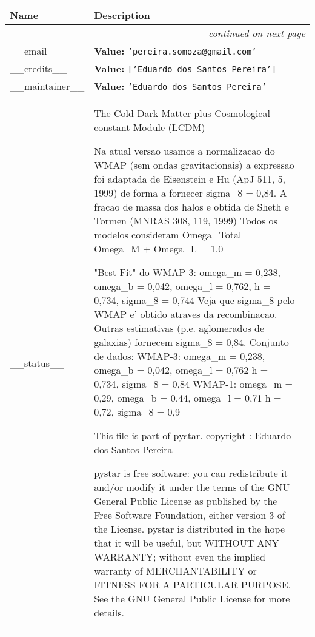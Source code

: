     \vspace{-1cm}
\hspace{\varindent}\begin{longtable}{|p{\varnamewidth}|p{\vardescrwidth}|l}
\cline{1-2}
\cline{1-2} \centering \textbf{Name} & \centering \textbf{Description}& \\
\cline{1-2}
\endhead\cline{1-2}\multicolumn{3}{r}{\small\textit{continued on next page}}\\\endfoot\cline{1-2}
\endlastfoot\raggedright \_\-\_\-e\-m\-a\-i\-l\-\_\-\_\- & \raggedright \textbf{Value:} 
{\tt \texttt{'}\texttt{pereira.somoza@gmail.com}\texttt{'}}&\\
\cline{1-2}
\raggedright \_\-\_\-c\-r\-e\-d\-i\-t\-s\-\_\-\_\- & \raggedright \textbf{Value:} 
{\tt \texttt{[}\texttt{'}\texttt{Eduardo dos Santos Pereira}\texttt{'}\texttt{]}}&\\
\cline{1-2}
\raggedright \_\-\_\-m\-a\-i\-n\-t\-a\-i\-n\-e\-r\-\_\-\_\- & \raggedright \textbf{Value:} 
{\tt \texttt{'}\texttt{Eduardo dos Santos Pereira}\texttt{'}}&\\
\cline{1-2}
\raggedright \_\-\_\-s\-t\-a\-t\-u\-s\-\_\-\_\- & \raggedright The Cold Dark Matter plus Cosmological constant Module (LCDM)

          Na atual versao usamos a normalizacao do WMAP (sem ondas 
          gravitacionais) a expressao foi adaptada de Eisenstein e Hu (ApJ 
          511, 5, 1999) de forma a fornecer sigma\_8 = 0,84. A fracao de 
          massa dos halos e obtida de Sheth e Tormen (MNRAS 308, 119, 1999)
          Todos os modelos consideram Omega\_Total = Omega\_M + Omega\_L = 
          1,0

          "Best Fit" do WMAP-3: omega\_m = 0,238, omega\_b = 0,042, 
          omega\_l = 0,762, h = 0,734, sigma\_8 = 0,744 Veja que sigma\_8 
          pelo WMAP e' obtido atraves da recombinacao. Outras estimativas 
          (p.e. aglomerados de galaxias) fornecem sigma\_8 = 0,84. Conjunto
          de dados: WMAP-3: omega\_m = 0,238, omega\_b = 0,042, omega\_l = 
          0,762 h = 0,734, sigma\_8 = 0,84 WMAP-1: omega\_m = 0,29, 
          omega\_b = 0,44, omega\_l = 0,71 h = 0,72, sigma\_8 = 0,9

          This file is part of pystar. copyright : Eduardo dos Santos 
          Pereira

          pystar is free software: you can redistribute it and/or modify it
          under the terms of the GNU General Public License as published by
          the Free Software Foundation, either version 3 of the License. 
          pystar is distributed in the hope that it will be useful, but 
          WITHOUT ANY WARRANTY; without even the implied warranty of 
          MERCHANTABILITY or FITNESS FOR A PARTICULAR PURPOSE.  See the GNU
          General Public License for more details.


\end{longtable}
